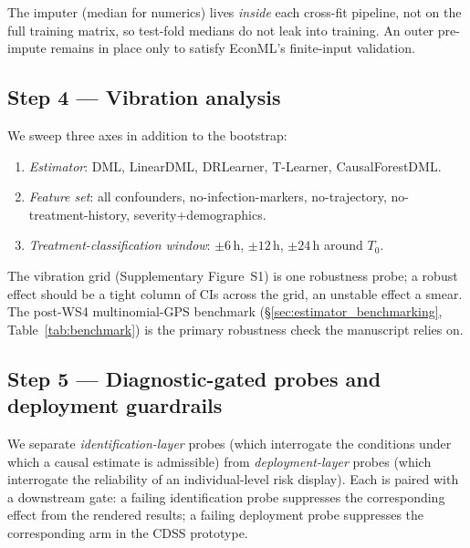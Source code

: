 \documentclass[11pt,a4paper]{article}
\begin{document}
The imputer (median for numerics) lives \emph{inside} each cross-fit pipeline, not on the full training matrix, so test-fold medians do not leak into training. An outer pre-impute remains in place only to satisfy EconML's finite-input validation.

\subsection{Step 4 — Vibration analysis}
We sweep three axes in addition to the bootstrap:
\begin{enumerate}[leftmargin=*,itemsep=2pt]
\item \emph{Estimator}: DML, LinearDML, DRLearner, T-Learner, CausalForestDML.
\item \emph{Feature set}: all confounders, no-infection-markers, no-trajectory, no-treatment-history, severity+demographics.
\item \emph{Treatment-classification window}: $\pm 6$\,h, $\pm 12$\,h, $\pm 24$\,h around $T_0$.
\end{enumerate}
The vibration grid (Supplementary Figure~S1) is one robustness probe; a robust effect should be a tight column of CIs across the grid, an unstable effect a smear. The post-WS4 multinomial-GPS benchmark (\S\ref{sec:estimator_benchmarking}, Table~\ref{tab:benchmark}) is the primary robustness check the manuscript relies on.

\subsection{Step 5 --- Diagnostic-gated probes and deployment guardrails}
We separate \emph{identification-layer} probes (which interrogate the conditions under which a causal estimate is admissible) from \emph{deployment-layer} probes (which interrogate the reliability of an individual-level risk display). Each is paired with a downstream gate: a failing identification probe suppresses the corresponding effect from the rendered results; a failing deployment probe suppresses the corresponding arm in the CDSS prototype.
\end{document}

